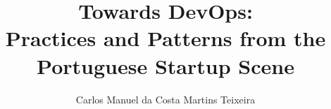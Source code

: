 \documentclass[11pt,a4paper,twoside,openright]{report}
\begin{document}
	\title{Towards DevOps: \\ Practices and Patterns from the Portuguese Startup Scene }
	\author{Carlos Manuel da Costa Martins Teixeira}

\begin{Prolog}
  
  \tableofcontents
\end{Prolog}


\StartBody




%  
%  
%  
  
%  
%  

\end{document}
